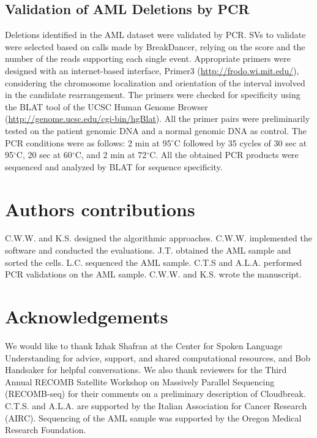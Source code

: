 \documentclass[10pt]{bmc_article}
\newenvironment{bmcformat}{\fussy\setboolean{publ}{true}}{\fussy}
\newcommand{\degree}{\ensuremath{^\circ}}
\begin{document}
\begin{bmcformat}
\subsection*{Validation of AML Deletions by PCR}

Deletions identified in the AML dataset were validated by PCR. SVs to validate were selected based on calls made by BreakDancer, relying on the score and the number of the reads supporting each single event. Appropriate primers were designed with an internet-based interface, Primer3 (\url{http://frodo.wi.mit.edu/}), considering the chromosome localization and orientation of the interval involved in the candidate rearrangement. The primers were checked for specificity using the BLAT tool of the UCSC Human Genome Browser (\url{http://genome.ucsc.edu/cgi-bin/hgBlat}). All the primer pairs were preliminarily tested on the patient genomic DNA and a normal genomic DNA as control. The PCR conditions were as follows: 2 min at 95\degree C followed by 35 cycles of 30 sec at 95\degree C, 20 sec at 60\degree C, and 2 min at 72\degree C. All the obtained PCR products were sequenced and analyzed by BLAT for sequence specificity. 

    
\section*{Authors contributions}


C.W.W. and K.S. designed the algorithmic approaches. C.W.W. implemented the software and conducted the evaluations. J.T. obtained the AML sample and sorted the cells. L.C. sequenced the AML sample. C.T.S and A.L.A. performed PCR validations on the AML sample. C.W.W. and K.S. wrote the manuscript.
    

\section*{Acknowledgements}

We would like to thank Izhak Shafran at the Center for Spoken Language Understanding for advice, support, and shared computational resources, and Bob Handsaker for helpful conversations. We also thank reviewers for the Third Annual RECOMB Satellite Workshop on Massively Parallel Sequencing (RECOMB-seq) for their comments on a preliminary description of Cloudbreak. C.T.S. and A.L.A. are supported by the Italian Association for Cancer Research (AIRC). Sequencing of the AML sample was supported by the Oregon Medical Research Foundation. 
 

\end{bmcformat}
\end{document}
